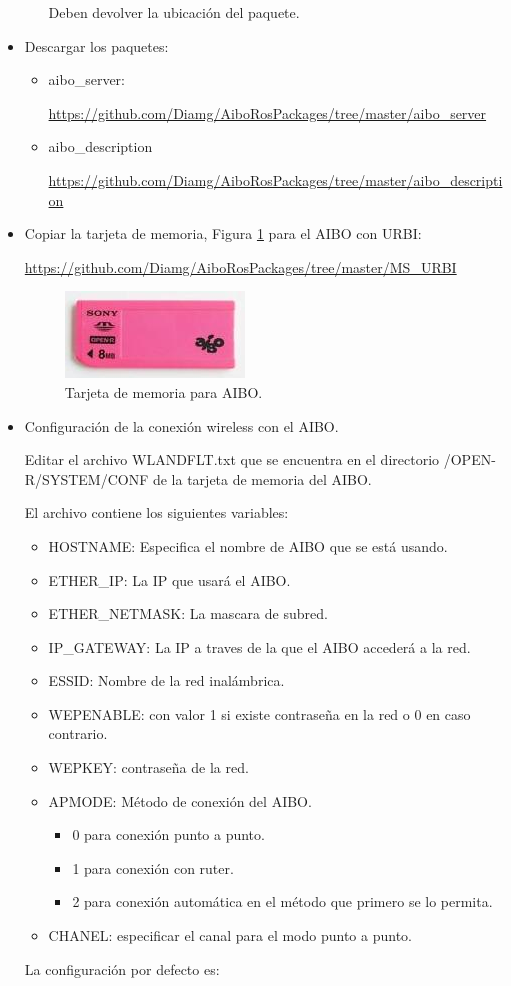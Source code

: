 \documentclass[12pt,a4paper,final,twoside]{book}
\begin{document}
\begin{itemize}
\begin{itemize}
Deben devolver la ubicación del paquete.
\end{itemize}

\item Descargar los paquetes:
\begin{itemize}
\item aibo{\_}server:

\url{https://github.com/Diamg/AiboRosPackages/tree/master/aibo_server}
\item aibo{\_}description

\url{https://github.com/Diamg/AiboRosPackages/tree/master/aibo_description}
\end{itemize}
\item Copiar la tarjeta de memoria, Figura \ref{fig:aiboMS} para el AIBO con URBI:

\url{https://github.com/Diamg/AiboRosPackages/tree/master/MS_URBI}
\begin{figure}[H]
	\centering
    \includegraphics[scale=0.5]{images/MS.jpg}
	 \caption{Tarjeta de memoria para AIBO.}
  \label{fig:aiboMS}
\end{figure}

\item Configuración de la conexión wireless con el AIBO.

Editar el archivo WLANDFLT.txt que se encuentra en el directorio /OPEN-R/SYSTEM/CONF de la tarjeta de memoria del AIBO.

El archivo contiene los siguientes variables:
\begin{itemize}
\item HOSTNAME: Especifica el nombre de AIBO que se está usando.
\item ETHER{\_}IP: La IP que usará el AIBO.
\item ETHER{\_}NETMASK: La mascara de subred.
\item IP{\_}GATEWAY: La IP a traves de la que el AIBO accederá a la red.
\item ESSID: Nombre de la red inalámbrica.
\item WEPENABLE: con valor 1 si existe contraseña en la red o 0 en caso contrario.
\item WEPKEY: contraseña de la red.
\item APMODE: Método de conexión del AIBO.
\begin{itemize}
\item 0 para conexión punto a punto.
\item 1 para conexión con ruter.
\item 2 para conexión automática en el método que primero se lo permita.
\end{itemize}
\item CHANEL: especificar el canal para el modo punto a punto.
\end{itemize}
La configuración por defecto es:


\end{itemize}
\end{document}
